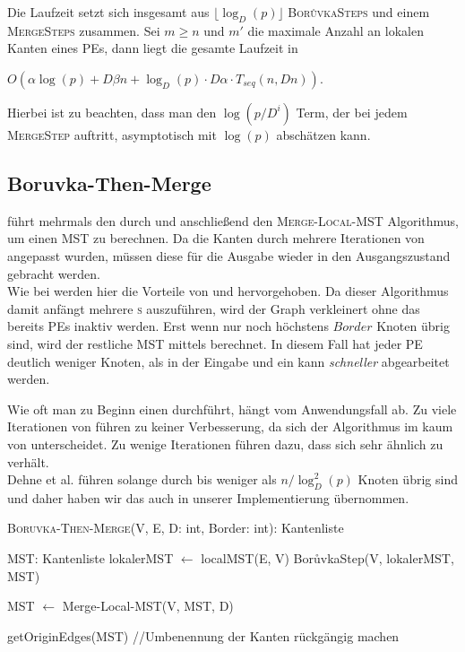 Die Laufzeit setzt sich insgesamt aus $\lfloor \log_{D}(p) \rfloor$  \textsc{Bor{\r u}vkaSteps} und einem \textsc{MergeSteps} zusammen. Sei $m \geq n$ und $m'$ die maximale Anzahl an lokalen Kanten eines PEs, dann liegt die gesamte Laufzeit in 
\begin{center}
$O(\alpha \log(p) + D\beta n + \log_D(p) \cdot D\alpha \cdot T_{seq}(n,Dn))$.
\end{center} 
Hierbei ist zu beachten, dass man den $\log(p/D^i)$ Term, der bei jedem \textsc{MergeStep} auftritt, asymptotisch mit $\log(p)$ abschätzen kann.


\subsection{Boruvka-Then-Merge}
\boruvkaThenMerge führt mehrmals den \boruvkaStep\space durch und anschließend den \textsc{Merge-Local-MST} Algorithmus, um einen MST zu berechnen. Da die Kanten durch mehrere Iterationen von \boruvkaAllreduce angepasst wurden, müssen diese für die Ausgabe wieder in den Ausgangszustand gebracht werden. \\
Wie bei \boruvkaMixedMerge werden hier die Vorteile von \boruvkaAllreduce und \mergeMST hervorgehoben.
Da dieser Algorithmus damit anfängt mehrere \boruvkaStep \textsc{s} auszuführen, wird der Graph verkleinert ohne das bereits PEs inaktiv werden. Erst wenn nur noch höchstens $Border$ Knoten übrig sind, wird der restliche MST mittels \mergeMST berechnet. In diesem Fall hat jeder PE deutlich weniger Knoten, als in der Eingabe und ein \mergeStep\space kann \emph{schneller} abgearbeitet werden.

Wie oft man zu Beginn einen \boruvkaStep \space durchführt, hängt vom Anwendungsfall ab. Zu viele Iterationen von \boruvkaAllreduce führen zu keiner Verbesserung, da sich der Algorithmus im kaum von \boruvkaAllreduce unterscheidet. Zu wenige Iterationen führen dazu, dass sich \boruvkaThenMerge sehr ähnlich zu \mergeMST verhält.\\
Dehne et al. \cite{dehne1998practical} führen \boruvka solange durch bis weniger als $n/\log_{D}^2(p)$ Knoten übrig sind und daher haben wir das auch in unserer Implementierung übernommen.



\begin{algorithm} 
\caption{\textsc{Boruvka-Then-Merge}(V, E, D: int, Border: int): Kantenliste}
\begin{algorithmic}[1]
\label{Boruvka-Then-Merge-Algo}

\STATE MST: Kantenliste
\STATE lokalerMST $\gets$ localMST(E, V)
    \STATE Bor{\r u}vkaStep(V, lokalerMST, MST)
\ENDWHILE

\STATE MST $\gets$ Merge-Local-MST(V, MST, D)

\RETURN getOriginEdges(MST) //Umbenennung der Kanten rückgängig machen
\end{algorithmic}
\end{algorithm}





